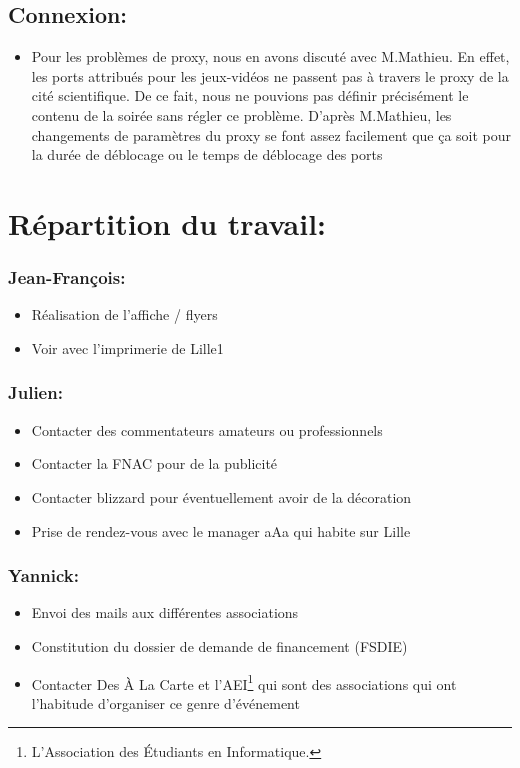 \subsection{Connexion:}
\begin{itemize}
\item Pour les problèmes de proxy, nous en avons discuté avec M.Mathieu. En effet, les ports attribués pour les jeux-vidéos ne passent pas à travers le proxy de la cité scientifique. De ce fait, nous ne pouvions pas définir précisément le contenu de la soirée sans régler ce problème. D'après M.Mathieu, les changements de paramètres du proxy se font assez facilement que ça soit pour la durée de déblocage ou le temps de déblocage des ports
\end{itemize}

\section{Répartition du travail:}

\subsubsection{Jean-François:}
\begin{itemize}
\item Réalisation de l'affiche / flyers
\item Voir avec l'imprimerie de Lille1
\end{itemize}

\subsubsection{Julien:}
\begin{itemize}
\item Contacter des commentateurs amateurs ou professionnels
\item Contacter la FNAC pour de la publicité
\item Contacter blizzard pour éventuellement avoir de la décoration
\item Prise de rendez-vous avec le manager aAa qui habite sur Lille
\end{itemize}

\subsubsection{Yannick:}
\begin{itemize}
\item Envoi des mails aux différentes associations
\item Constitution du dossier de demande de financement (FSDIE)
\item Contacter \og Des À La Carte \fg{} et l'AEI\footnote{L'Association des Étudiants en Informatique.} qui sont des associations qui ont l'habitude d'organiser ce genre d’événement
\end{itemize}
